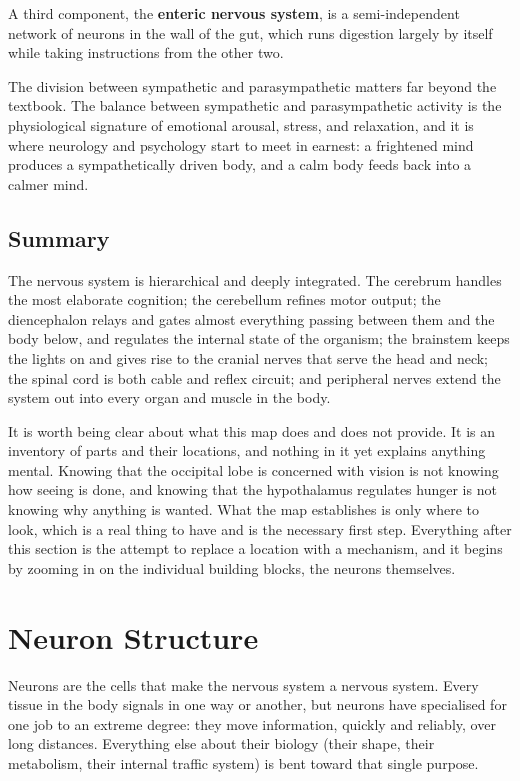 \documentclass[11pt]{article}
\begin{document}
A third component, the \textbf{enteric nervous system}, is a semi-independent network of neurons in the wall of the gut, which runs digestion largely by itself while taking instructions from the other two.

The division between sympathetic and parasympathetic matters far beyond the textbook. The balance between sympathetic and parasympathetic activity is the physiological signature of emotional arousal, stress, and relaxation, and it is where neurology and psychology start to meet in earnest: a frightened mind produces a sympathetically driven body, and a calm body feeds back into a calmer mind.

\subsection{Summary}

The nervous system is hierarchical and deeply integrated. The cerebrum handles the most elaborate cognition; the cerebellum refines motor output; the diencephalon relays and gates almost everything passing between them and the body below, and regulates the internal state of the organism; the brainstem keeps the lights on and gives rise to the cranial nerves that serve the head and neck; the spinal cord is both cable and reflex circuit; and peripheral nerves extend the system out into every organ and muscle in the body.

It is worth being clear about what this map does and does not provide. It is an inventory of parts and their locations, and nothing in it yet explains anything mental. Knowing that the occipital lobe is concerned with vision is not knowing how seeing is done, and knowing that the hypothalamus regulates hunger is not knowing why anything is wanted. What the map establishes is only where to look, which is a real thing to have and is the necessary first step. Everything after this section is the attempt to replace a location with a mechanism, and it begins by zooming in on the individual building blocks, the neurons themselves.


\section{Neuron Structure}

Neurons are the cells that make the nervous system a nervous system. Every tissue in the body signals in one way or another, but neurons have specialised for one job to an extreme degree: they move information, quickly and reliably, over long distances. Everything else about their biology (their shape, their metabolism, their internal traffic system) is bent toward that single purpose.
\end{document}
